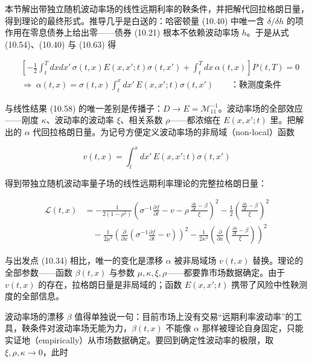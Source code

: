 本节解出带独立随机波动率场的线性远期利率的鞅条件，并把解代回拉格朗日量，得到理论的最终形式。推导几乎是白送的：哈密顿量 (10.40) 中唯一含 $\delta/\delta h$ 的项作用在零息债券上给出零——债券 (10.21) 根本不依赖波动率场 $h$。于是从式 (10.54)、(10.40) 与 (10.63) 得

\begin{equation*}
\begin{aligned}
&\left[-\frac{1}{2}\int_t^T dxdx'\,\sigma(t,x)E(x,x';t)\sigma(t,x')+\int_t^T dx\,\alpha(t,x)\right]P(t,T)=0\\
&\Rightarrow\ \alpha(t,x)=\sigma(t,x)\int_t^x dx'\,E(x,x';t)\sigma(t,x')
\qquad\text{：鞅测度条件}
\end{aligned}
\tag{10.66}
\end{equation*}

与线性结果 (10.58) 的唯一差别是传播子：$D\to E=\mathcal{M}_{11}^{-1}$。波动率场的全部效应——刚度 $\kappa$、波动率的波动率 $\xi$、相关系数 $\rho$——都浓缩在 $E(x,x';t)$ 里。把解出的 $\alpha$ 代回拉格朗日量。为记号方便定义波动率场的非局域（non-local）函数

\begin{equation*}
v(t,x)=\int_t^x dx'\,E(x,x';t)\sigma(t,x')
\tag{10.67}
\end{equation*}

得到带独立随机波动率量子场的线性远期利率理论的完整拉格朗日量：

\begin{equation*}
\begin{aligned}
\mathcal{L}(t,x)&=-\frac{1}{2(1-\rho^2)}\left(\sigma^{-1}\frac{\partial f}{\partial t}-v-\rho\,\frac{\frac{\partial h}{\partial t}-\beta}{\xi}\right)^2-\frac{1}{2}\left(\frac{\frac{\partial h}{\partial t}-\beta}{\xi}\right)^2\\
&\quad-\frac{1}{2\mu^2}\left(\frac{\partial}{\partial x}\left(\sigma^{-1}\frac{\partial f}{\partial t}-v\right)\right)^2-\frac{1}{2\kappa^2}\left(\frac{\partial}{\partial x}\left(\frac{\frac{\partial h}{\partial t}-\beta}{\xi}\right)\right)^2
\end{aligned}
\tag{10.68}
\end{equation*}

与出发点 (10.34) 相比，唯一的变化是漂移 $\alpha$ 被非局域场 $v(t,x)$ 替换。理论的全部参数——函数 $\beta(t,x)$ 与参数 $\mu,\kappa,\xi,\rho$——都要靠市场数据确定。由于 $v(t,x)$ 的存在，拉格朗日量是非局域的；函数 $E(x,x';t)$ 携带了风险中性鞅测度的全部信息。

波动率场的漂移 $\beta$ 值得单独说一句：目前市场上没有交易“远期利率波动率”的工具，鞅条件对波动率场无能为力，$\beta(t,x)$ 不能像 $\alpha$ 那样被理论自身固定，只能实证地（empirically）从市场数据确定。要回到确定性波动率的极限，取 $\xi,\rho,\kappa\to0$，此时

